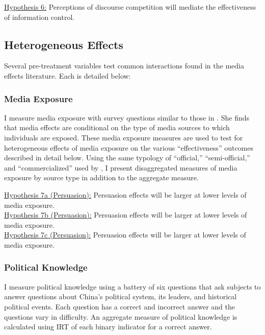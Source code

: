 \documentclass[11pt]{article}
\begin{document}
\noindent\underline{Hypothesis 6:} Perceptions of discourse competition will mediate the effectiveness of information control.

\subsection{Heterogeneous Effects}

Several pre-treatment variables test common interactions found in the media effects literature. Each is detailed below:

\subsubsection{Media Exposure}

I measure media exposure with survey questions similar to those in \cite{stockmann2013media}. She finds that media effects are conditional on the type of media sources to which individuals are exposed. These media exposure measures are used to test for heterogeneous effects of media exposure on the various ``effectiveness'' outcomes described in detail below. Using the same typology of ``official,'' ``semi-official,'' and ``commercialized'' used by \cite{stockmann2013media}, I present disaggregated measures of media exposure by source type in addition to the aggregate measure.\newline

\noindent\underline{Hypothesis 7a  (Persuasion):} Persuasion effects will be larger at lower levels of media exposure.\\
\noindent\underline{Hypothesis 7b  (Persuasion):} Persuasion effects will be larger at lower levels of media exposure.\\
\noindent\underline{Hypothesis 7c  (Persuasion):} Persuasion effects will be larger at lower levels of media exposure.

\subsubsection{Political Knowledge}

I measure political knowledge using a battery of six questions that ask subjects to answer questions about China's political system, its leaders, and historical political events. Each question has a correct and incorrect answer and the questions vary in difficulty. An aggregate measure of political knowledge is calculated using IRT of each binary indicator for a correct answer.\newline
\end{document}
